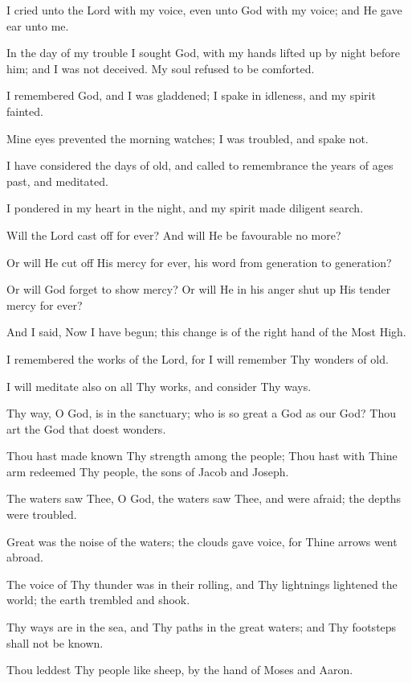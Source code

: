 I cried unto the Lord with my voice, even unto God with my voice; and He gave ear unto me.

In the day of my trouble I sought God, with my hands lifted up by night before him; and I was not deceived. My soul refused to be comforted.

I remembered God, and I was gladdened; I spake in idleness, and my spirit fainted.

Mine eyes prevented the morning watches; I was troubled, and spake not.

I have considered the days of old, and called to remembrance the years of ages past, and meditated.

I pondered in my heart in the night, and my spirit made diligent search.

Will the Lord cast off for ever? And will He be favourable no more?

Or will He cut off His mercy for ever, his word from generation to generation?

Or will God forget to show mercy? Or will He in his anger shut up His tender mercy for ever?

And I said, Now I have begun; this change is of the right hand of the Most High.

I remembered the works of the Lord, for I will remember Thy wonders of old.

I will meditate also on all Thy works, and consider Thy ways.

Thy way, O God, is in the sanctuary; who is so great a God as our God? Thou art the God that doest wonders.

Thou hast made known Thy strength among the people; Thou hast with Thine arm redeemed Thy people, the sons of Jacob and Joseph.

The waters saw Thee, O God, the waters saw Thee, and were afraid; the depths were troubled.

Great was the noise of the waters; the clouds gave voice, for Thine arrows went abroad.

The voice of Thy thunder was in their rolling, and Thy lightnings lightened the world; the earth trembled and shook.

Thy ways are in the sea, and Thy paths in the great waters; and Thy footsteps shall not be known.

Thou leddest Thy people like sheep, by the hand of Moses and Aaron.
